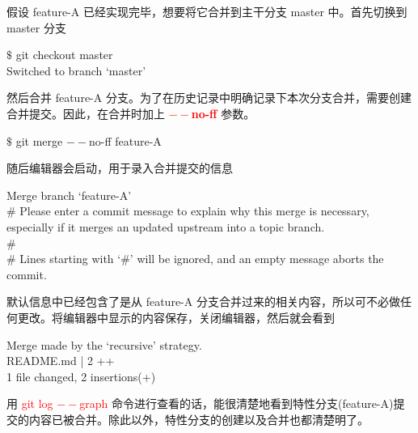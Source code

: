 \documentclass[12pt,a4paper]{article}
\begin{document}
假设 feature-A 已经实现完毕，想要将它合并到主干分支 master 中。首先切换到 master 分支
\begin{tcolorbox}[colback=green!5,colframe=green!40!black,title= ]
$\$$ git checkout master \\
Switched to branch `master'
\end{tcolorbox}
然后合并 feature-A 分支。为了在历史记录中明确记录下本次分支合并，需要创建合并提交。因此，在合并时加上 \textcolor{red}{\bf $--$no-ff} 参数。
\begin{tcolorbox}[colback=green!5,colframe=green!40!black,title= ]
$\$$ git merge $--$no-ff feature-A
\end{tcolorbox}
随后编辑器会启动，用于录入合并提交的信息
\begin{tcolorbox}[colback=green!5,colframe=green!40!black,title= ]
Merge branch `feature-A' \\
$\#$ Please enter a commit message to explain why this merge is necessary, especially if it merges an updated upstream into a topic branch. \\
$\#$ \\
$\#$ Lines starting with `$\#$' will be ignored, and an empty message aborts the commit.
\end{tcolorbox}
默认信息中已经包含了是从 feature-A 分支合并过来的相关内容，所以可不必做任何更改。将编辑器中显示的内容保存，关闭编辑器，然后就会看到
\begin{tcolorbox}[colback=green!5,colframe=green!40!black,title= ]
Merge made by the `recursive' strategy. \\
README.md | 2 ++ \\
1 file changed, 2 insertions(+)
\end{tcolorbox}
用 \textcolor{red}{git log $--$graph} 命令进行查看的话，能很清楚地看到特性分支(feature-A)提交的内容已被合并。除此以外，特性分支的创建以及合并也都清楚明了。
\end{document}
